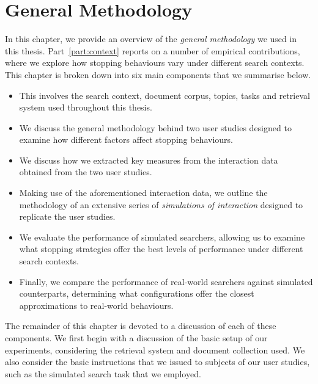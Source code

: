 
\chapter[General Methodology]{General Methodology}\label{chap:method}
In this chapter, we provide an overview of the \emph{general methodology} we used in this thesis. Part~\ref{part:context} reports on a number of empirical contributions, where we explore how stopping behaviours vary under different search contexts. This chapter is broken down into six main components that we summarise below.

\begin{itemize}
    \item{ This involves the search context, document corpus, topics, tasks and retrieval system used throughout this thesis.}
    \item{ We discuss the general methodology behind two user studies designed to examine how different factors affect stopping behaviours.}
    \item{ We discuss how we extracted key measures from the interaction data obtained from the two user studies.}
    \item{ Making use of the aforementioned interaction data, we outline the methodology of an extensive series of \emph{simulations of interaction} designed to replicate the user studies.}
    \item{ We evaluate the performance of simulated searchers, allowing us to examine what stopping strategies offer the best levels of performance under different search contexts.}
    \item{ Finally, we compare the performance of real-world searchers against simulated counterparts, determining what configurations offer the closest approximations to real-world behaviours.}
\end{itemize}

The remainder of this chapter is devoted to a discussion of each of these components. We first begin with a discussion of the basic setup of our experiments, considering the retrieval system and document collection used. We also consider the basic instructions that we issued to subjects of our user studies, such as the simulated search task that we employed.

